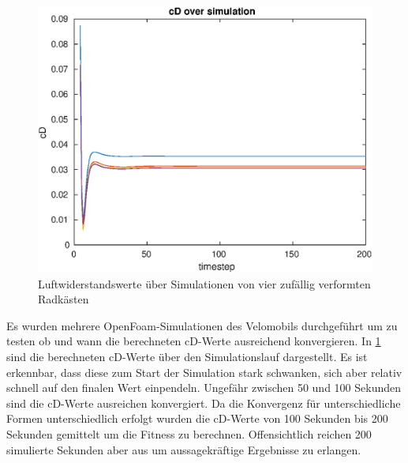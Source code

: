 \begin{figure}[h]
	\centering
	\includegraphics[width=.8\linewidth]{bilder/wheelcaseCDConvergence}
	\caption{Luftwiderstandswerte über Simulationen von vier zufällig verformten Radkästen}
	\label{fig:wheelcase_convergence}
\end{figure}
Es wurden mehrere OpenFoam-Simulationen des Velomobils durchgeführt um zu testen ob und wann die berechneten cD-Werte ausreichend konvergieren.
In \cref{fig:wheelcase_convergence} sind die berechneten cD-Werte über den Simulationslauf dargestellt. 
Es ist erkennbar, dass diese zum Start der Simulation stark schwanken, sich aber relativ schnell auf den finalen Wert einpendeln.
Ungefähr zwischen 50 und 100 Sekunden sind die cD-Werte ausreichen konvergiert.
Da die Konvergenz für unterschiedliche Formen unterschiedlich erfolgt wurden die cD-Werte von 100 Sekunden bis 200 Sekunden gemittelt um die Fitness zu berechnen.
Offensichtlich reichen 200 simulierte Sekunden aber aus um aussagekräftige Ergebnisse zu erlangen.



